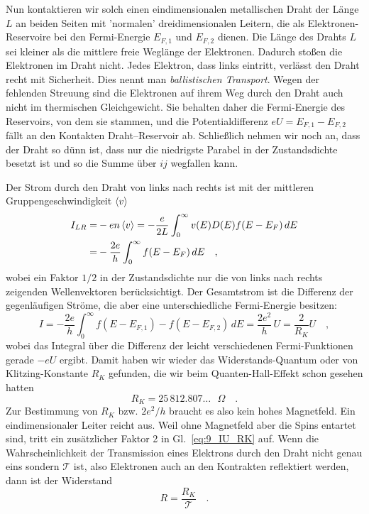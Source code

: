 Nun kontaktieren wir solch einen eindimensionalen metallischen Draht der Länge $L$ an beiden Seiten mit 'normalen' dreidimensionalen Leitern, die als Elektronen-Reservoire bei den Fermi-Energie $E_{F,1}$ und  $E_{F,2}$ dienen.  Die Länge des Drahts $L$ sei kleiner als die mittlere freie Weglänge der Elektronen. Dadurch stoßen die Elektronen im Draht nicht. Jedes Elektron, dass links eintritt, verlässt den Draht recht mit Sicherheit. Dies nennt man \emph{ballistischen Transport}. Wegen der fehlenden Streuung sind die Elektronen auf ihrem Weg durch den Draht auch nicht im thermischen Gleichgewicht. Sie behalten daher die Fermi-Energie des Reservoirs, von dem sie stammen, und die Potentialdifferenz $e U = E_{F,1} - E_{F,2}$ fällt an den Kontakten Draht--Reservoir ab. Schließlich nehmen wir noch an, dass der Draht so dünn ist, dass nur die niedrigste Parabel in der Zustandsdichte besetzt ist und so die Summe über $ij$ wegfallen kann.

Der Strom durch den Draht von links nach rechts ist  mit  der mittleren Gruppengeschwindigkeit $\braket{v}$
\begin{align}
    I_{LR} = & -e n \braket{v} = - \frac{e}{2 L} \int_0^\infty v(E) D(E) f(E - E_F) \, dE \\
    = & - \frac{2 e}{h} \int_0^\infty  f(E - E_F) \,  dE \quad ,
\end{align}
wobei ein Faktor $1/2$ in der Zustandsdichte nur die von links nach rechts zeigenden Wellenvektoren berücksichtigt.  Der Gesamtstrom ist die Differenz der gegenläufigen Ströme, die aber eine unterschiedliche Fermi-Energie besitzen:
\begin{equation}
    I = - \frac{2 e}{h} \int_0^\infty  f(E - E_{F,1}) -  f(E - E_{F,2}) \, dE =  \frac{2 e^2}{h} \, U = \frac{2}{R_K} U \quad ,
    \label{eq:9_IU_RK}
\end{equation}
wobei das Integral über die Differenz der leicht verschiedenen Fermi-Funktionen gerade $- e U$ ergibt. Damit haben wir wieder das Widerstands-Quantum oder von Klitzing-Konstante $R_K$ gefunden, die wir beim Quanten-Hall-Effekt schon gesehen hatten
\begin{equation}
    R_K = 25 \, 812.807\dots\text{ $\Omega$} \quad .
\end{equation}
Zur Bestimmung von $R_K$ bzw. $2e^2/h$ braucht es also kein hohes Magnetfeld. Ein eindimensionaler Leiter reicht aus. Weil ohne Magnetfeld aber die Spins entartet sind, tritt ein zusätzlicher Faktor 2 in Gl.~\ref{eq:9_IU_RK} auf. 
Wenn die Wahrscheinlichkeit der Transmission eines Elektrons durch den Draht nicht genau eins sondern $\mathcal{T}$ ist, also Elektronen auch an den Kontrakten reflektiert werden, dann ist der Widerstand
\begin{equation}
    R = \frac{R_K}{\mathcal{T}} \quad .
\end{equation}


